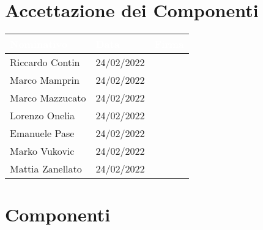 \newpage
\section{Accettazione dei Componenti}

\begin{center}
  \centering
  \begin{longtable}{|C{3,5cm}|C{2.2cm}|C{6,5cm}|}
    \hline
    \textcolor[HTML]{FFFFFF}{\textbf{Nominativo}} & \textcolor[HTML]{FFFFFF}{\textbf{Data}} & \textcolor[HTML]{FFFFFF}{\textbf{Firma}} \\ \hline
    Riccardo Contin & 24/02/2022 &  \\ \hline
    Marco Mamprin & 24/02/2022 &  \\ \hline
    Marco Mazzucato & 24/02/2022 &  \\ \hline
    Lorenzo Onelia & 24/02/2022 &  \\ \hline
    Emanuele Pase & 24/02/2022 &  \\ \hline
    Marko Vukovic & 24/02/2022 &  \\ \hline
    Mattia Zanellato & 24/02/2022 &  \\ \hline
  \end{longtable}
\end{center}

\section{Componenti}
\renewcommand\arraystretch{1,5}

